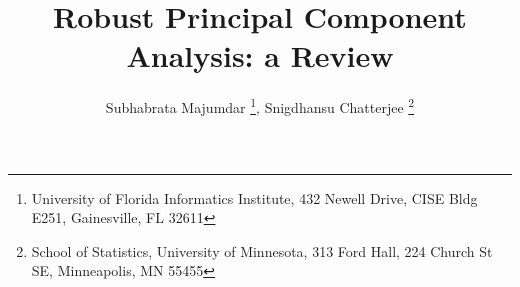 \documentclass[12pt]{article}
\title{Robust Principal Component Analysis: a Review}
\author{Subhabrata Majumdar
\thanks{University of Florida Informatics Institute, 432 Newell Drive, CISE Bldg E251, Gainesville, FL 32611}, Snigdhansu Chatterjee
\thanks{School of Statistics, University of Minnesota, 313 Ford Hall, 224 Church St SE, Minneapolis, MN 55455}}
\begin{document}
\maketitle

\newtheorem{Theorem}{Theorem}[section]
\newtheorem{Lemma}[Theorem]{Lemma}
\newtheorem{Corollary}[Theorem]{Corollary}
\newtheorem{Proposition}[Theorem]{Proposition}
\newtheorem{Conjecture}[Theorem]{Conjecture}
\theoremstyle{definition} \newtheorem{Definition}[Theorem]{Definition}

\date{}
\maketitle

\vspace{.5cm}
\end{document}

